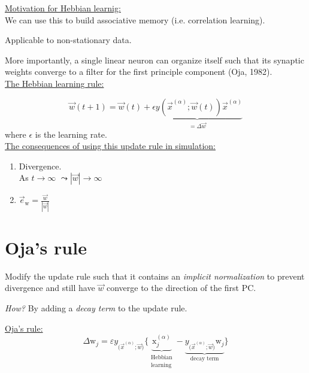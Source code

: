 \newpage

\underline{Motivation for Hebbian learnig:}\\

We can use this to build associative memory (i.e. correlation learning).

Applicable to non-stationary data.

More importantly, a single linear neuron 
can organize itself such that its synaptic weights converge to a filter 
for the first principle component (Oja, 1982).\\

\underline{The Hebbian learning rule:}

$$
\vec w(t+1) = \vec w(t) + \underbrace{\epsilon y(\vec x^ {(\alpha)}; \vec w(t)) \vec x^{(\alpha)}}_{= \Delta \vec w}
$$
where $\epsilon$ is the learning rate.\\

\underline{The consequences of using this update rule in simulation:}\\

\begin{enumerate}
\item Divergence.\\
As $t \rightarrow \infty$ \qquad $\leadsto |\vec{w}| \rightarrow \infty$\\


\item $\vec{e}_{\mathrm{w}} = \frac{\vec{w}}{|\vec{w}|}$ 
\end{enumerate}

\newpage

\section{Oja's rule}
\vspace{0.5cm}

Modify the update rule such that it contains an 
\emph{implicit normalization} to prevent divergence and 
still have $\vec w$ converge to the direction of the first PC.

\emph{How?} By adding a \emph{decay term} to the update rule.

\underline{Oja's rule:}
\begin{equation*}
	\Delta \mathrm{w}_j = \varepsilon y_{ \big( \vec{x}^{(\alpha)}; \vec{w}
		\big) } \bigg\{ 
			\underbrace{ \mathrm{x}_j^{(\alpha)} }_{
				\substack{	\text{Hebbian} \\
						\text{learning} }}
			- \underbrace{ y_{ \big( \vec{x}^{(\alpha)}; \vec{w}
				\big) } \mathrm{w}_j }_{\text{decay term}}
			\bigg\}
\end{equation*}

